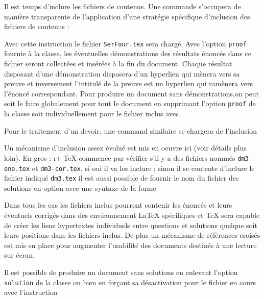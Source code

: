 \documentclass[11pt,report,oneside,solution]{cpgedev}
\begin{document}
Il est temps d'inclure les fichiers de contenus. Une commande s'occupera de manière transparente de l'application d'une stratégie spécifique d'inclusion des fichiers de contenus :
\begin{latex}[]
\end{latex}
Avec cette instruction le fichier \verb+SerFour.tex+ sera chargé. Avec l'option \verb+proof+ fournie à la classe, les éventuelles démonstrations des résultats énoncés dans ce fichier seront collectées et insérées à la fin du document.  Chaque résultat disposant d'une démonstration disposera d'un hyperlien qui mènera vers sa preuve et inversement l'intitulé de la preuve est un hyperlien qui ramènera vers l'énoncé correspondant.  Pour produire un document sans démonstrations,on peut soit le faire globalement pour tout le document en supprimant l'option \verb+proof+ de la classe soit individuellement pour le fichier inclus avec 
\begin{latex}[]
\end{latex}
Pour le traitement d'un devoir, une command similaire se chargera de l'inclusion 
\begin{latex}[]
\end{latex} 
Un mécanisme d'inclusion assez évolué est mis en oeuvre ici (voir détails plus loin). En gros :
\xit\i+
\TeX{} commence par vérifier s'il y a des fichiers nommés \verb+dm3-eno.tex+ et \verb+dm3-cor.tex+, si oui il va les inclure ;
\xit sinon il se contente d'inclure le fichier indiqué \verb+dm3.tex+
\xit il est aussi possible de fournir le nom du fichier des solutions en option avec une syntaxe de la forme   
\begin{latex}[]
\end{latex}
\exit 
Dans tous les cas les fichiers inclus pourront contenir les énoncés et leurs éventuels corrigés dans des environnement \LaTeX{} spécifiques et \TeX{} sera capable de créer les liens hypertextes individuels entre questions et solutions quelque soit leurs positions dans les fichiers inclus. De plus un mécanisme de références croisés est mis en place pour augmenter l'usabilité des documents destinés à une lecture sur écran. 

Il est possible de produire un document sans solutions en enlevant l'option \verb+solution+ de la classe ou bien en forçant sa désactivation pour le fichier en cours avec l'instruction
\begin{latex}[]
\end{latex}
\end{document}
